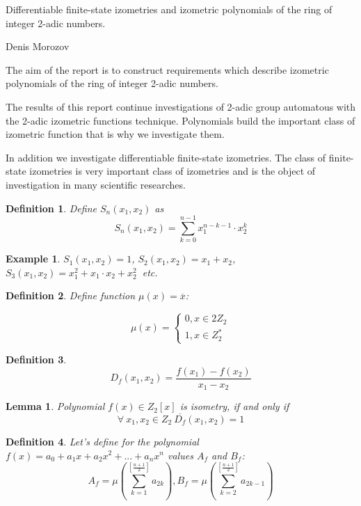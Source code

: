 \documentclass[12pt]{article}
\newtheorem{lemma}{Lemma}
\newtheorem{definition}{Definition}
\newtheorem{example}{Example}
\begin{document}
\begin{center}
{\LARGE Differentiable finite-state izometries and izometric
polynomials of  the ring of integer 2-adic numbers.}
\end{center}
\vskip 0.1cm \centerline{\large \large Denis Morozov } \vskip
0.5cm

The aim of the report is to construct requirements which describe
izometric polynomials of the ring of integer 2-adic numbers.

The results of this report continue investigations of 2-adic group
automatous with the 2-adic izometric functions technique.
Polynomials build the important class of izometric function that
is why we investigate them.

In addition we investigate differentiable finite-state izometries.
The class of finite-state izometries is very important class of
izometries and is the object of investigation in many scientific
researches.

\begin{definition}
Define $S_n(x_1,x_2)$ as  $$S_n(x_1,x_2)=\sum_{k=0}^{n-1}
x_1^{n-k-1}\cdot x_2^k $$
 \end{definition}


 \begin{example} $S_1(x_1,x_2)=1$, $S_2(x_1,x_2)=x_1+x_2$, $S_3(x_1,x_2)
 =x_1^2+x_1\cdot x_2+x_2^2\ $ etc.
 \end{example}
 \begin{definition}  Define function $\mu(x)=\overline{ x}$:

$$
\mu(x)=\begin{cases}
0, x\in 2Z_2\\

1,x\in Z_2^*
\end{cases}
$$
 \end{definition}





 \begin{definition}
 $$D_f(x_1,x_2)=\frac{f(x_1)-f(x_2)}{x_1-x_2}$$
 \end{definition}


 \begin{lemma}\label{izomumov1}
 Polynomial $f(x)\in Z_2[x]$ is isometry, if and only if $$\forall\ x_1,x_2 \in Z_2\  \overline{D_f}(x_1,x_2)=1$$
 \end{lemma}

 \begin{definition}
 Let's define for the polynomial $f(x)=a_0+a_1x+a_2x^2+...+a_nx^n$ values $A_f$ and $B_f$:
 $$ A_f=\mu \left(\sum_{k=1}^{[\frac{n+1}{2}]}a_{2k}\right), B_f=\mu \left(\sum_{k=2}^{[\frac{n+1}{2}]}a_{2k-1}\right)$$
  \end{definition}
\end{document}
